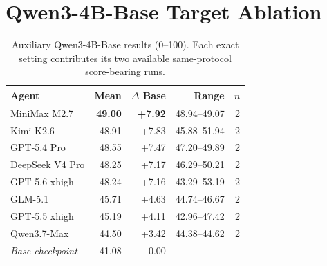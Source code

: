 \documentclass{article}
\begin{document}
\appendix
\section{Qwen3-4B-Base Target Ablation}
\label{app:qwen3}

\begin{table}[t]
\centering
\small
\setlength{\tabcolsep}{5pt}
\caption{Auxiliary Qwen3-4B-Base results (0--100). Each exact setting contributes its two
available same-protocol score-bearing runs.}
\begin{tabular}{lrrrr}
\toprule
Agent & Mean & $\Delta$ Base & Range & $n$ \\
\midrule
MiniMax M2.7 & \textbf{49.00} & \textbf{+7.92} & 48.94--49.07 & 2 \\
Kimi K2.6 & 48.91 & +7.83 & 45.88--51.94 & 2 \\
GPT-5.4 Pro & 48.55 & +7.47 & 47.20--49.89 & 2 \\
DeepSeek V4 Pro & 48.25 & +7.17 & 46.29--50.21 & 2 \\
GPT-5.6 xhigh & 48.24 & +7.16 & 43.29--53.19 & 2 \\
GLM-5.1 & 45.71 & +4.63 & 44.74--46.67 & 2 \\
GPT-5.5 xhigh & 45.19 & +4.11 & 42.96--47.42 & 2 \\
Qwen3.7-Max & 44.50 & +3.42 & 44.38--44.62 & 2 \\
\emph{Base checkpoint} & 41.08 & 0.00 & -- & -- \\
\bottomrule
\end{tabular}
\end{table}



\end{document}

